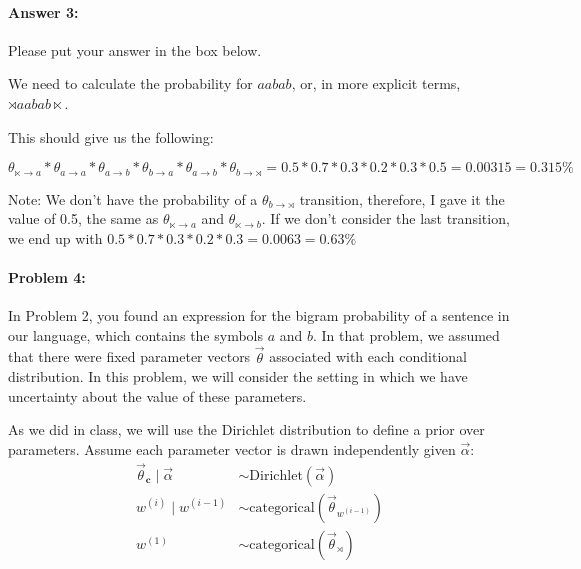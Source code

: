 \documentclass[10pt]{article}
\newenvironment{AnswerBox}{\begin{mdframed}[style=simple]}{\end{mdframed}}
\begin{document}
\paragraph{Answer 3:} Please put your answer in the box below.


\begin{AnswerBox}%
We need to calculate the probability for $aabab$, or, in more explicit terms, $\rtimes aabab \ltimes$.

This should give us the following:

$
\theta_{\ltimes \rightarrow a} *
\theta_{a \rightarrow a} *
\theta_{a \rightarrow b} *
\theta_{b \rightarrow a} *
\theta_{a \rightarrow b} *
\theta_{b \rightarrow \rtimes} =
0.5 * 0.7 * 0.3 * 0.2 * 0.3 * 0.5 =
0.00315 = 0.315\%
$


Note: We don't have the probability of a $\theta_{b \rightarrow \rtimes}$ transition, therefore, I gave it the value of 0.5, the same as $\theta_{\ltimes \rightarrow a}$ and $\theta_{\ltimes \rightarrow b}$. If we don't consider the last transition, we end up with $0.5 * 0.7 * 0.3 * 0.2 * 0.3 = 0.0063 = 0.63\%$

    
\end{AnswerBox}%


\hrulefill %

\paragraph{Problem 4:}

In Problem 2, you found an expression for the bigram probability of a
sentence in our language, which contains the symbols $a$ and $b$. In
that problem, we assumed that there were fixed parameter vectors
$\vec{\theta}$ associated with each conditional distribution. In this
problem, we will consider the setting in which we have uncertainty
about the value of these parameters.

 As we did in class, we will use the Dirichlet distribution to 
define a prior over parameters.  Assume each parameter vector is drawn
independently given $\vec{\alpha}$:
\begin{align}
\vec{\theta}_{\mathbf{c}} \mid \vec{\alpha} 
    &\sim\mathrm{Dirichlet}(\vec{\alpha}) \\
w^{(i)} \mid  w^{(i-1)} 
    &\sim\mathrm{categorical}(\vec{\theta}_{w^{(i-1)}}) \\
w^{(1)} 
    &\sim \mathrm{categorical}(\vec{\theta}_{\rtimes})\
\end{align}
\end{document}
